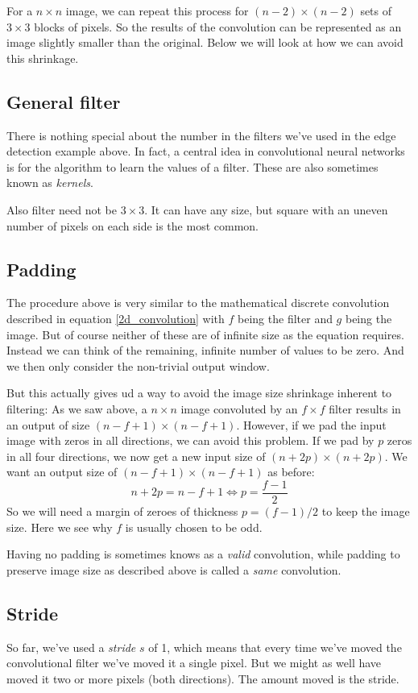 \documentclass[12pt, a4paper]{article}
\numberwithin{equation}{section}
\begin{document}
For a $n\times n$ image, we can repeat this process for $(n-2)\times(n-2)$ sets of $3\times 3$ blocks of pixels. So the results of the convolution can be represented as an image slightly smaller than the original. Below we will look at how we can avoid this shrinkage.

\subsection{General filter}
There is nothing special about the number in the filters we've used in the edge detection example above. In fact, a central idea in convolutional neural networks is for the algorithm to learn the values of a filter. These are also sometimes known as \textit{kernels}.

Also filter need not be $3\times 3$. It can have any size, but square with an uneven number of pixels on each side is the most common.

\subsection{Padding}
The procedure above is very similar to the mathematical discrete convolution described in equation \ref{2d_convolution} with $f$ being the filter and $g$ being the image. But of course neither of these are of infinite size as the equation requires. Instead we can think of the remaining, infinite number of values to be zero. And we then only consider the non-trivial output window.

But this actually gives ud a way to avoid the image size shrinkage inherent to filtering: As we saw above, a $n\times n$ image convoluted by an $f\times f$ filter results in an output of size $(n-f+1)\times(n-f+1)$. However, if we pad the input image with zeros in all directions, we can avoid this problem. If we pad by $p$ zeros in all four directions, we now get a new input size of $(n+2p)\times(n+2p)$. We want an output size of $(n-f+1)\times(n-f+1)$ as before:
\begin{equation}
n+2p=n-f+1\Leftrightarrow p=\frac{f-1}{2}
\end{equation}
So we will need a margin of zeroes of thickness $p=(f-1)/2$ to keep the image size. Here we see why $f$ is usually chosen to be odd.

Having no padding is sometimes knows as a \textit{valid} convolution, while padding to preserve image size as described above is called a \textit{same} convolution.

\subsection{Stride}
So far, we've used a \textit{stride} $s$ of 1, which means that every time we've moved the convolutional filter we've moved it a single pixel. But we might as well have moved it two or more pixels (both directions). The amount moved is the stride.
\end{document}
